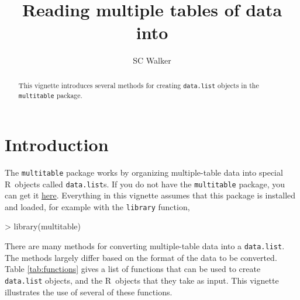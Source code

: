 \documentclass{article}
\title{Reading multiple tables of data into \R}
\author{SC Walker}
\newcommand{\R}{{\sf R}}
\newcommand{\code}[1]{\texttt{#1}}
\numberwithin{exercise}{section}
\begin{document}
\maketitle
\tableofcontents

\begin{abstract}
This vignette introduces several methods for creating \code{data.list} objects in the \code{multitable} package.
\end{abstract}



\section{Introduction}

The \code{multitable} package works by organizing multiple-table data into special \R\ objects called \code{data.list}s.  If you do not have the \code{multitable} package, you can get it \href{https://r-forge.r-project.org/R/?group_id=1171}{here}.  Everything in this vignette assumes that this package is installed and loaded, for example with the \code{library} function,
\begin{Schunk}
\begin{Sinput}
> library(multitable)
\end{Sinput}
\end{Schunk}

There are many methods for converting multiple-table data into a \code{data.list}.  The methods largely differ based on the format of the data to be converted.  Table \ref{tab:functions} gives a list of functions that can be used to create \code{data.list} objects, and the \R\ objects that they take as input.  This vignette illustrates the use of several of these functions.
\end{document}

